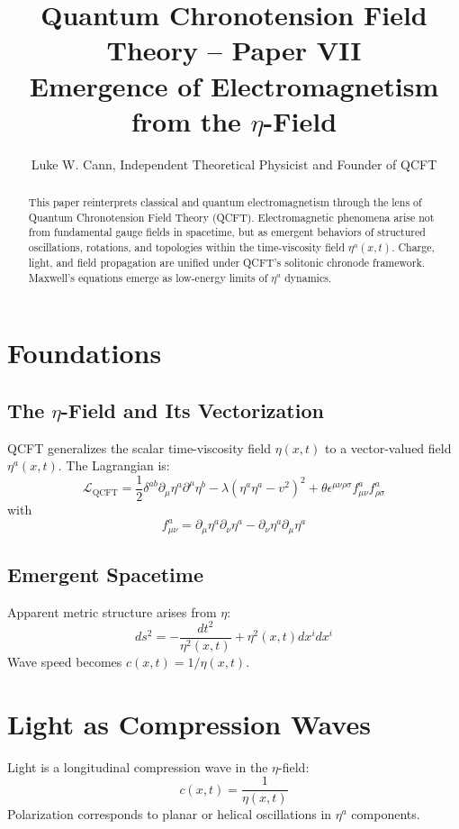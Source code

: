 \documentclass[12pt]{article}
\title{Quantum Chronotension Field Theory – Paper VII\\Emergence of Electromagnetism from the $\eta$-Field}
\author{Luke W. Cann, Independent Theoretical Physicist and Founder of QCFT}
\date{}
\begin{document}
\maketitle

\begin{abstract}
This paper reinterprets classical and quantum electromagnetism through the lens of Quantum Chronotension Field Theory (QCFT). Electromagnetic phenomena arise not from fundamental gauge fields in spacetime, but as emergent behaviors of structured oscillations, rotations, and topologies within the time-viscosity field $\eta^a(x,t)$. Charge, light, and field propagation are unified under QCFT's solitonic chronode framework. Maxwell's equations emerge as low-energy limits of $\eta^a$ dynamics.
\end{abstract}

\section{Foundations}

\subsection{The $\eta$-Field and Its Vectorization}

QCFT generalizes the scalar time-viscosity field $\eta(x,t)$ to a vector-valued field $\eta^a(x,t)$. The Lagrangian is:
\[
\mathcal{L}_{\text{QCFT}} = \frac{1}{2} \delta^{ab} \partial_\mu \eta^a \partial^\mu \eta^b - \lambda (\eta^a \eta^a - v^2)^2 + \theta \epsilon^{\mu\nu\rho\sigma} f^a_{\mu\nu} f^a_{\rho\sigma}
\]
with
\[
f^a_{\mu\nu} = \partial_\mu \eta^a \partial_\nu \eta^a - \partial_\nu \eta^a \partial_\mu \eta^a
\]

\subsection{Emergent Spacetime}

Apparent metric structure arises from $\eta$:
\[
ds^2 = -\frac{dt^2}{\eta^2(x,t)} + \eta^2(x,t) dx^i dx^i
\]
Wave speed becomes $c(x,t) = 1/\eta(x,t)$.

\section{Light as Compression Waves}

Light is a longitudinal compression wave in the $\eta$-field:
\[
c(x,t) = \frac{1}{\eta(x,t)}
\]
Polarization corresponds to planar or helical oscillations in $\eta^a$ components.
\end{document}
